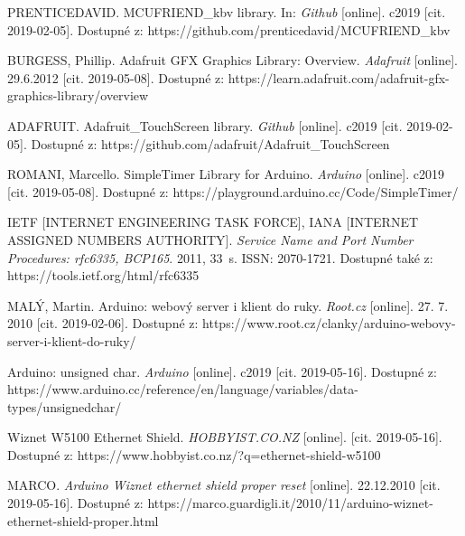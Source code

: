 \begin{thebibliography}{30}
PRENTICEDAVID. MCUFRIEND\_kbv library. In: \textit{Github} [online]. c2019 [cit. 2019-02-05]. Dostupné z: https://github.com/prenticedavid/MCUFRIEND\_kbv

BURGESS, Phillip. Adafruit GFX Graphics Library: Overview. \textit{Adafruit} [online]. 29.6.2012 [cit. 2019-05-08]. Dostupné z: https://learn.adafruit.com/adafruit-gfx-graphics-library/overview

ADAFRUIT. Adafruit\_TouchScreen library. \textit{Github} [online]. c2019 [cit. 2019-02-05]. Dostupné z: https://github.com/adafruit/Adafruit\_TouchScreen

ROMANI, Marcello. SimpleTimer Library for Arduino. \textit{Arduino} [online]. c2019 [cit. 2019-05-08]. Dostupné z: https://playground.arduino.cc/Code/SimpleTimer/

IETF [INTERNET ENGINEERING TASK FORCE], IANA [INTERNET ASSIGNED NUMBERS AUTHORITY]. \textit{Service Name and Port Number Procedures: rfc6335, BCP165}. 2011, 33~s. ISSN: 2070-1721. Dostupné také z: https://tools.ietf.org/html/rfc6335

MALÝ, Martin. Arduino: webový server i klient do ruky. \textit{Root.cz} [online]. 27. 7. 2010 [cit. 2019-02-06]. Dostupné z: https://www.root.cz/clanky/arduino-webovy-server-i-klient-do-ruky/

Arduino: unsigned char. \textit{Arduino} [online]. c2019 [cit. 2019-05-16]. Dostupné z: https://www.arduino.cc/reference/en/language/variables/data-types/unsignedchar/

Wiznet W5100 Ethernet Shield. \textit{HOBBYIST.CO.NZ} [online]. [cit. 2019-05-16]. Dostupné z: https://www.hobbyist.co.nz/?q=ethernet-shield-w5100

MARCO. \textit{Arduino Wiznet ethernet shield proper reset} [online]. 22.12.2010 [cit. 2019-05-16]. Dostupné z: https://marco.guardigli.it/2010/11/arduino-wiznet-ethernet-shield-proper.html

\end{thebibliography}
